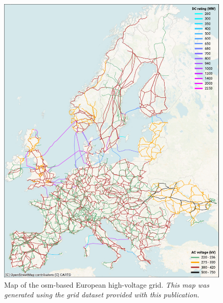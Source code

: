 \documentclass[fleqn,10pt]{wlscirep}
\let\autocite\cite
\begin{document}
\begin{figure}[!htbp]
    \centering
     \includegraphics[width=0.99\textwidth] {figures/fig_osm_map.pdf}
    \caption{Map of the \acrshort{osm}-based European high-voltage grid. \textit{This map was generated using the grid dataset provided with this publication. \autocite{xiongPrebuiltElectricityNetwork2024}}}
    \label{fig:osm_map}
\end{figure}


\newpage
\newpage
\end{document}
